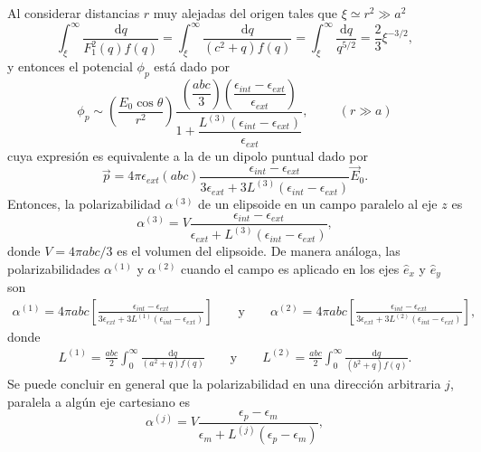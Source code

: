 Al considerar distancias $r$ muy alejadas del origen tales que $\xi\simeq r^2\gg a^2$
\begin{equation*}
    \int_{\xi}^{\infty}\frac{\text{d}q}{F_1^2(q)f(q)}= \int_{\xi}^{\infty}\frac{\text{d}q}{(c^2+q)f(q)}=\int_{\xi}^{\infty}\frac{\text{d}q}{q^{5/2}}=\frac{2}{3}\xi^{-3/2},
\end{equation*}
y entonces el potencial $\phi_p$ está dado por
\begin{equation}
    \phi_p\sim\left(\dfrac{E_0\cos\theta}{r^2}\right)\dfrac{\left(\dfrac{abc}{3}\right)\left(\dfrac{\epsilon_{int}-\epsilon_{ext}}{\epsilon_{ext}}\right)}{1+\dfrac{L^{(3)}(\epsilon_{int}-\epsilon_{ext})}{\epsilon_{ext}}},\hspace{1cm}(r\gg a)
\end{equation}
cuya expresión es equivalente a la de un dipolo puntual dado por
\begin{equation}
    \Vec{p}=4\pi\epsilon_{ext} (abc)\frac{\epsilon_{int}-\epsilon_{ext}}{3\epsilon_{ext}+3L^{(3)}(\epsilon_{int}-\epsilon_{ext})}\Vec{E}_0
    \label{momento_dip}.
\end{equation}
Entonces, la polarizabilidad $\alpha^{(3)}$ de un elipsoide en un campo paralelo al eje $z$ es
\begin{equation}
    \alpha^{(3)}=V\frac{\epsilon_{int}-\epsilon_{ext}}{\epsilon_{ext}+L^{(3)}(\epsilon_{int}-\epsilon_{ext})},
\end{equation}
donde $V=4\pi abc/3$ es el volumen del elipsoide. De manera análoga, las polarizabilidades $ \alpha^{(1)}$ y $ \alpha^{(2)}$ cuando el campo es aplicado en los ejes $\hat{e}_x$ y $\hat{e}_y$ son
\begin{align*}
    \alpha^{(1)}=4\pi abc\left[ \frac{\epsilon_{int}-\epsilon_{ext}}{3\epsilon_{ext}+3L^{(1)}(\epsilon_{int}-\epsilon_{ext})}\right]\qquad\text{y}\qquad
    \alpha^{(2)}=4\pi abc\left[ \frac{\epsilon_{int}-\epsilon_{ext}}{3\epsilon_{ext}+3L^{(2)}(\epsilon_{int}-\epsilon_{ext})}\right],
\end{align*}
donde 
\begin{align*}
    L^{(1)}=\frac{abc}{2}\int_{0}^{\infty}\frac{\text{d}q}{(a^2+q)f(q)}\qquad\text{y}\qquad
    L^{(2)}=\frac{abc}{2}\int_{0}^{\infty}\frac{\text{d}q}{(b^2+q)f(q)}.
\end{align*}
Se puede concluir en general que la polarizabilidad en una dirección arbitraria $j$, paralela a algún eje cartesiano es
\begin{equation}
    \alpha^{(j)}=V\frac{\epsilon_p-\epsilon_m}{\epsilon_m+L^{(j)}(\epsilon_p-\epsilon_m)},
\end{equation}
